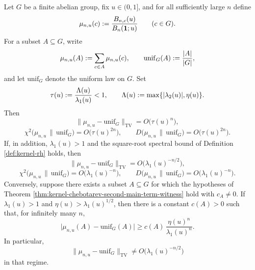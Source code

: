 \begin{theorem}\label{thm:kernel-chebotarev-statistical-convergence}
Let \(G\) be a finite abelian group, fix \(u\in(0,1]\), and for all sufficiently large \(n\) define
\[
\mu_{n,u}(c):=\frac{B_{n,c}(u)}{B_n(\mathbf{1};u)}
\qquad(c\in G).
\]
For a subset \(A\subseteq G\), write
\[
\mu_{n,u}(A):=\sum_{c\in A}\mu_{n,u}(c),
\qquad
\mathrm{unif}_G(A):=\frac{\lvert A\rvert}{\lvert G\rvert},
\]
and let \(\mathrm{unif}_G\) denote the uniform law on \(G\). Set
\[
\tau(u):=\frac{\Lambda(u)}{\lambda_1(u)}<1,
\qquad
\Lambda(u):=\max\{\lvert \lambda_2(u)\rvert,\eta(u)\}.
\]
Then
\[
\|\mu_{n,u}-\mathrm{unif}_G\|_{\mathrm{TV}}
=
O\!\bigl(\tau(u)^n\bigr),
\]
\[
\chi^2\!\bigl(\mu_{n,u}\,\|\,\mathrm{unif}_G\bigr)
=
O\!\bigl(\tau(u)^{2n}\bigr),
\qquad
D\!\bigl(\mu_{n,u}\,\|\,\mathrm{unif}_G\bigr)
=
O\!\bigl(\tau(u)^{2n}\bigr).
\]
If, in addition, \(\lambda_1(u)>1\) and the square-root spectral bound of Definition \ref{def:kernel-rh} holds, then
\[
\|\mu_{n,u}-\mathrm{unif}_G\|_{\mathrm{TV}}
=
O\!\bigl(\lambda_1(u)^{-n/2}\bigr),
\]
\[
\chi^2\!\bigl(\mu_{n,u}\,\|\,\mathrm{unif}_G\bigr)
=
O\!\bigl(\lambda_1(u)^{-n}\bigr),
\qquad
D\!\bigl(\mu_{n,u}\,\|\,\mathrm{unif}_G\bigr)
=
O\!\bigl(\lambda_1(u)^{-n}\bigr).
\]
Conversely, suppose there exists a subset \(A\subseteq G\) for which the hypotheses of Theorem \ref{thm:kernel-chebotarev-second-main-term-witness} hold with \(c_A\neq 0\). If \(\lambda_1(u)>1\) and \(\eta(u)>\lambda_1(u)^{1/2}\), then there is a constant \(c(A)>0\) such that, for infinitely many \(n\),
\[
\bigl|\mu_{n,u}(A)-\mathrm{unif}_G(A)\bigr|
\ge
c(A)\,\frac{\eta(u)^n}{\lambda_1(u)^n}.
\]
In particular,
\[
\|\mu_{n,u}-\mathrm{unif}_G\|_{\mathrm{TV}}
\neq
O\!\bigl(\lambda_1(u)^{-n/2}\bigr)
\]
in that regime.
\end{theorem}

